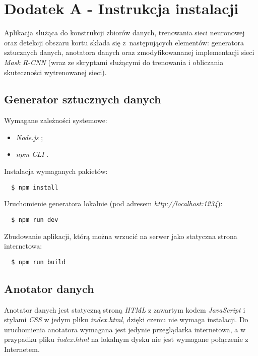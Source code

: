 \chapter*{Dodatek A - Instrukcja instalacji}
\label{sec:instrukcja-instalacji}

Aplikacja służąca do konstrukcji zbiorów danych, trenowania sieci neuronowej oraz detekcji obszaru kortu składa się z~następujących elementów: generatora sztucznych danych, anotatora danych oraz zmodyfikowananej implementacji sieci \textit{Mask R-CNN} \cite{matterport-mask-rcnn} (wraz ze skryptami służącymi do trenowania i obliczania skuteczności wytrenowanej sieci).

\section*{Generator sztucznych danych}

Wymagane zależności systemowe:

\begin{itemize}
  \item \textit{Node.js} \cite{nodejs};
  \item \textit{npm CLI} \cite{npm}.
\end{itemize}

Instalacja wymaganych pakietów:

\begin{verbatim}
  $ npm install
\end{verbatim}

Uruchomienie generatora lokalnie (pod adresem \textit{http://localhost:1234}):

\begin{verbatim}
  $ npm run dev
\end{verbatim}

Zbudowanie aplikacji, którą można wrzucić na serwer jako statyczna strona internetowa:

\begin{verbatim}
  $ npm run build
\end{verbatim}

\section*{Anotator danych}
Anotator danych jest statyczną stroną \textit{HTML} z zawartym kodem \textit{JavaScript} i stylami \textit{CSS} w jedym pliku \textit{index.html}, dzięki czemu nie wymaga instalacji. Do uruchomienia anotatora wymagana jest jedynie przeglądarka internetowa, a w przypadku pliku \textit{index.html} na lokalnym dysku nie jest wymagane połączenie z Internetem.

